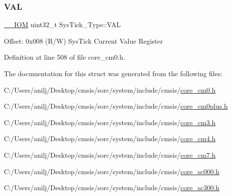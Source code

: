 \subsubsection{\texorpdfstring{V\+AL}{VAL}}
{\footnotesize\ttfamily \hyperlink{core__sc300_8h_ab6caba5853a60a17e8e04499b52bf691}{\+\_\+\+\_\+\+I\+OM} uint32\+\_\+t Sys\+Tick\+\_\+\+Type\+::\+V\+AL}

Offset\+: 0x008 (R/W) Sys\+Tick Current Value Register 

Definition at line 508 of file core\+\_\+cm0.\+h.



The documentation for this struct was generated from the following files\+:\begin{DoxyCompactItemize}
\item 
C\+:/\+Users/anilj/\+Desktop/cmsis/sorc/system/include/cmsis/\hyperlink{core__cm0_8h}{core\+\_\+cm0.\+h}\item 
C\+:/\+Users/anilj/\+Desktop/cmsis/sorc/system/include/cmsis/\hyperlink{core__cm0plus_8h}{core\+\_\+cm0plus.\+h}\item 
C\+:/\+Users/anilj/\+Desktop/cmsis/sorc/system/include/cmsis/\hyperlink{core__cm3_8h}{core\+\_\+cm3.\+h}\item 
C\+:/\+Users/anilj/\+Desktop/cmsis/sorc/system/include/cmsis/\hyperlink{core__cm4_8h}{core\+\_\+cm4.\+h}\item 
C\+:/\+Users/anilj/\+Desktop/cmsis/sorc/system/include/cmsis/\hyperlink{core__cm7_8h}{core\+\_\+cm7.\+h}\item 
C\+:/\+Users/anilj/\+Desktop/cmsis/sorc/system/include/cmsis/\hyperlink{core__sc000_8h}{core\+\_\+sc000.\+h}\item 
C\+:/\+Users/anilj/\+Desktop/cmsis/sorc/system/include/cmsis/\hyperlink{core__sc300_8h}{core\+\_\+sc300.\+h}\end{DoxyCompactItemize}
